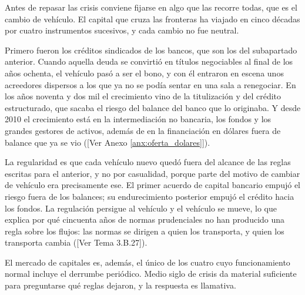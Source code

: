 \documentclass[10pt,a4paper]{article}
\newcommand{\authorfont}[1]{{\fontfamily{EBGaramond-TLF}\selectfont #1}}
\begin{document}
Antes de repasar las crisis conviene fijarse en algo que las recorre todas, que es el cambio de vehículo. El capital que cruza las fronteras ha viajado en cinco décadas por cuatro instrumentos sucesivos, y cada cambio no fue neutral.

Primero fueron los créditos sindicados de los bancos, que son los del subapartado anterior. Cuando aquella deuda se convirtió en títulos negociables al final de los años ochenta, el vehículo pasó a ser el bono, y con él entraron en escena unos acreedores dispersos a los que ya no se podía sentar en una sala a renegociar. En los años noventa y dos mil el crecimiento vino de la titulización y del crédito estructurado, que sacaba el riesgo del balance del banco que lo originaba. Y desde 2010 el crecimiento está en la intermediación no bancaria, los fondos y los grandes gestores de activos, además de en la financiación en dólares fuera de balance que ya se vio ([\authorfont{Ver Anexo \ref{anx:oferta_dolares}}]).

La regularidad es que cada vehículo nuevo quedó fuera del alcance de las reglas escritas para el anterior, y no por casualidad, porque parte del motivo de cambiar de vehículo era precisamente ese. El primer acuerdo de capital bancario empujó el riesgo fuera de los balances; su endurecimiento posterior empujó el crédito hacia los fondos. La regulación persigue al vehículo y el vehículo se mueve, lo que explica por qué cincuenta años de normas prudenciales no han producido una regla sobre los flujos: las normas se dirigen a quien los transporta, y quien los transporta cambia ([\authorfont{Ver Tema 3.B.27}]).

El mercado de capitales es, además, el único de los cuatro cuyo funcionamiento normal incluye el derrumbe periódico. Medio siglo de crisis da material suficiente para preguntarse qué reglas dejaron, y la respuesta es llamativa.
\end{document}
